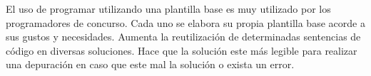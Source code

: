 El uso de programar utilizando una plantilla base es muy utilizado por los programadores de concurso. Cada uno se elabora su propia plantilla base acorde a sus gustos y necesidades. Aumenta la reutilización de determinadas sentencias de código en diversas soluciones. Hace que la solución este más legible para realizar una depuración en caso que este mal la solución o exista un error. 